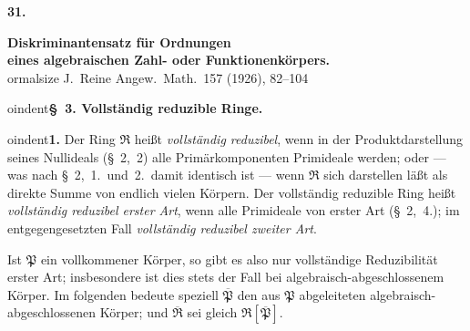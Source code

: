 \documentclass[12pt,a4paper]{article}
\newcommand{\mf}[1]{\mathfrak{#1}}     %
\newcommand{\PP}{\mathfrak{P}}          %
\theoremstyle{definition}
\begin{document}
\renewenvironment{noetherpaper}[4]{\newpage\section*{#1}\addcontentsline{toc}{section}{#1}\par\smallskip}{\par\medskip}


\setcounter{page}{551}


\begin{center}
{\Large\bfseries 31.}
\medskip

{\Large\bfseries Diskriminantensatz f\"ur Ordnungen\\[0.3em]
  eines algebraischen Zahl- oder Funktionenk\"orpers.}\\[0.5em]
{ ormalsize J.\ Reine Angew.\ Math.\ 157 (1926), 82--104}
\end{center}

\vspace{1em}



oindent\textbf{\S~3. Vollst\"andig reduzible Ringe.}

\medskip



oindent\textbf{1.} Der Ring $\mf{R}$ hei\ss t \textit{vollst\"andig reduzibel}, wenn in der
Produktdarstellung seines Nullideals (\S~2,~2) alle Prim\"arkomponenten
Primideale werden; oder --- was nach \S~2,~1.\ und~2.\ damit identisch ist ---
wenn $\mf{R}$ sich darstellen l\"a\ss t als direkte Summe von endlich vielen
K\"orpern. Der vollst\"andig reduzible Ring hei\ss t \textit{vollst\"andig reduzibel
erster Art}, wenn alle Primideale von erster Art (\S~2,~4.); im
entgegengesetzten Fall \textit{vollst\"andig reduzibel zweiter Art}.

Ist $\PP$ ein vollkommener K\"orper, so gibt es also nur vollst\"andige
Reduzibilit\"at erster Art; insbesondere ist dies stets der Fall bei
algebraisch-abgeschlossenem K\"orper. Im folgenden bedeute speziell
$\overline{\PP}$ den aus $\PP$ abgeleiteten algebraisch-abgeschlossenen K\"orper;
und $\overline{\mf{R}}$ sei gleich $\mf{R}[\overline{\PP}]$.
\end{document}

